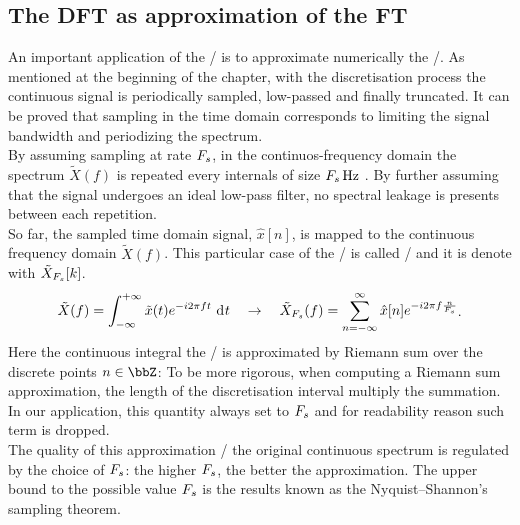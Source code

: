 \subsection{The DFT as approximation of the FT}\label{subsec:processing:ftapprox}
An important application of the \DFT/ is to approximate numerically the \FT/.
As mentioned at the beginning of the chapter, with the discretisation process the continuous signal is periodically sampled, low-passed and finally truncated.
It can be proved that sampling in the time domain corresponds to limiting the signal bandwidth and periodizing the spectrum.
\\By assuming sampling at rate $F_s$, in the continuos-frequency domain the spectrum $\tilde{X}(f)$ is repeated every internals of size $\Fs\,\si{\Hz}$ .
By further assuming that the signal undergoes an ideal low-pass filter, no spectral leakage is presents between each repetition.
\\So far, the sampled time domain signal, $\hat{x}[n]$, is mapped to the continuous frequency domain $\tilde{X}(f)$.
This particular case of the \FT/ is called \DTFTdef/ and it is denote with $\tilde{X}_{F_s}[ k]$.
\begin{equation}\label{eq:processing:ft2dtft}
    \begin{aligned}
        \tilde{X}(f) =
        \int_{-\infty}^{+\infty}
        \tilde{x}(t)
        \cste^{-\csti 2 \pi f t}
        \,\kdiff{t}
        \quad \rightarrow \quad
        \tilde{X}_{\Fs}( f) =
        \sum_{n = -\infty}^{\infty}
        \hat{x}[ n]
        \cste^{-\csti2\pi f \frac{n}{\Fs}}
    \end{aligned}
    .
\end{equation}
Here the continuous integral the \FT/ is approximated by Riemann sum over the discrete points $n \in \Z$:
To be more rigorous, when computing a Riemann sum approximation, the length of the discretisation interval multiply the summation.
In our application, this quantity always set to $F_s$ and for readability reason such term is dropped.
\\The quality of this approximation \wrt/ the original continuous spectrum is regulated by the choice of $F_s$: the higher $F_s$, the better the approximation.
The upper bound to the possible value $F_s$ is the results known as the Nyquist–Shannon's sampling theorem.

